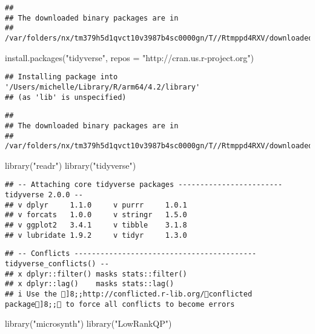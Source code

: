 \documentclass[
]{article}
\newenvironment{Shaded}{\begin{snugshade}}{\end{snugshade}}
\newcommand{\AttributeTok}[1]{\textcolor[rgb]{0.77,0.63,0.00}{#1}}
\newcommand{\FunctionTok}[1]{\textcolor[rgb]{0.00,0.00,0.00}{#1}}
\newcommand{\NormalTok}[1]{#1}
\newcommand{\StringTok}[1]{\textcolor[rgb]{0.31,0.60,0.02}{#1}}
\begin{document}
\begin{verbatim}
## 
## The downloaded binary packages are in
##  /var/folders/nx/tm379h5d1qvct10v3987b4sc0000gn/T//Rtmppd4RXV/downloaded_packages
\end{verbatim}

\begin{Shaded}
\begin{Highlighting}[]
\FunctionTok{install.packages}\NormalTok{(}\StringTok{"tidyverse"}\NormalTok{, }\AttributeTok{repos =} \StringTok{"http://cran.us.r{-}project.org"}\NormalTok{)}
\end{Highlighting}
\end{Shaded}

\begin{verbatim}
## Installing package into '/Users/michelle/Library/R/arm64/4.2/library'
## (as 'lib' is unspecified)
\end{verbatim}

\begin{verbatim}
## 
## The downloaded binary packages are in
##  /var/folders/nx/tm379h5d1qvct10v3987b4sc0000gn/T//Rtmppd4RXV/downloaded_packages
\end{verbatim}

\begin{Shaded}
\begin{Highlighting}[]
\FunctionTok{library}\NormalTok{(}\StringTok{"readr"}\NormalTok{)}
\FunctionTok{library}\NormalTok{(}\StringTok{"tidyverse"}\NormalTok{)}
\end{Highlighting}
\end{Shaded}

\begin{verbatim}
## -- Attaching core tidyverse packages ------------------------ tidyverse 2.0.0 --
## v dplyr     1.1.0     v purrr     1.0.1
## v forcats   1.0.0     v stringr   1.5.0
## v ggplot2   3.4.1     v tibble    3.1.8
## v lubridate 1.9.2     v tidyr     1.3.0
\end{verbatim}

\begin{verbatim}
## -- Conflicts ------------------------------------------ tidyverse_conflicts() --
## x dplyr::filter() masks stats::filter()
## x dplyr::lag()    masks stats::lag()
## i Use the ]8;;http://conflicted.r-lib.org/conflicted package]8;; to force all conflicts to become errors
\end{verbatim}

\begin{Shaded}
\begin{Highlighting}[]
\FunctionTok{library}\NormalTok{(}\StringTok{"microsynth"}\NormalTok{)}
\FunctionTok{library}\NormalTok{(}\StringTok{"LowRankQP"}\NormalTok{)}
\end{Highlighting}
\end{Shaded}
\end{document}
